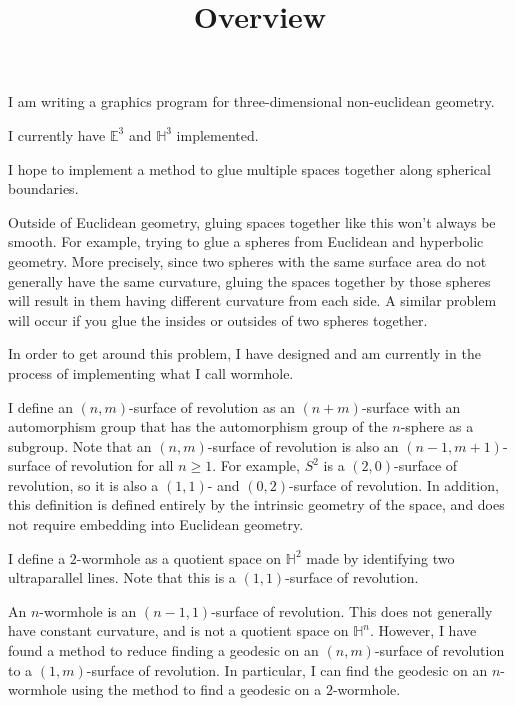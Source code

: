 \documentclass[12pt]{amsart}
\begin{document}
\title{Overview}
\maketitle

I am writing a graphics program for three-dimensional non-euclidean geometry.

I currently have $\mathbb{E}^3$ and $\mathbb{H}^3$ implemented.

I hope to implement a method to glue multiple spaces together along spherical boundaries.

Outside of Euclidean geometry, gluing spaces together like this won't always be smooth. For example, trying to glue a spheres from Euclidean and hyperbolic geometry. More precisely, since two spheres with the same surface area do not generally have the same curvature, gluing the spaces together by those spheres will result in them having different curvature from each side. A similar problem will occur if you glue the insides or outsides of two spheres together.

In order to get around this problem, I have designed and am currently in the process of implementing what I call wormhole.

I define an $(n,m)$-surface of revolution as an $(n+m)$-surface with an automorphism group that has the automorphism group of the $n$-sphere as a subgroup. Note that an $(n,m)$-surface of revolution is also an $(n-1,m+1)$-surface of revolution for all $n \geq 1$. For example, $S^2$ is a $(2,0)$-surface of revolution, so it is also a $(1,1)$- and $(0,2)$-surface of revolution. In addition, this definition is defined entirely by the intrinsic geometry of the space, and does not require embedding into Euclidean geometry.


I define a $2$-wormhole as a quotient space on $\mathbb{H}^2$ made by identifying two ultraparallel lines. Note that this is a $(1,1)$-surface of revolution.

An $n$-wormhole is an $(n-1,1)$-surface of revolution. This does not generally have constant curvature, and is not a quotient space on $\mathbb{H}^n$. However, I have found a method to reduce finding a geodesic on an $(n,m)$-surface of revolution to a $(1,m)$-surface of revolution. In particular, I can find the geodesic on an $n$-wormhole using the method to find a geodesic on a $2$-wormhole.
\end{document}
